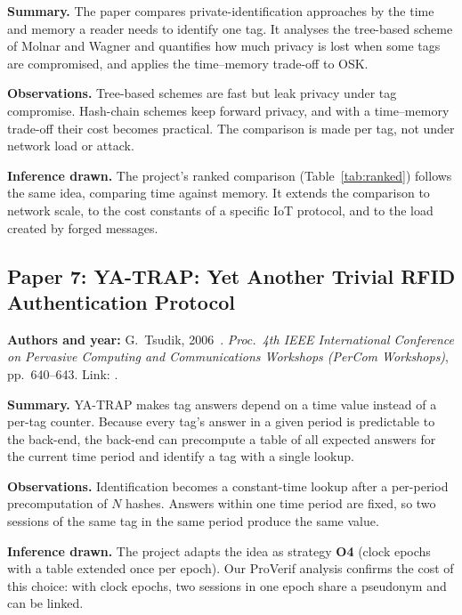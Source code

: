\textbf{Summary.} The paper compares private-identification approaches by the time and memory a reader needs to identify one tag. It analyses the tree-based scheme of Molnar and Wagner and quantifies how much privacy is lost when some tags are compromised, and applies the time--memory trade-off to OSK.

\textbf{Observations.} Tree-based schemes are fast but leak privacy under tag compromise. Hash-chain schemes keep forward privacy, and with a time--memory trade-off their cost becomes practical. The comparison is made per tag, not under network load or attack.

\textbf{Inference drawn.} The project's ranked comparison (Table~\ref{tab:ranked}) follows the same idea, comparing time against memory. It extends the comparison to network scale, to the cost constants of a specific IoT protocol, and to the load created by forged messages.

\subsection*{Paper 7: YA-TRAP: Yet Another Trivial RFID Authentication Protocol}
\textbf{Authors and year:} G.~Tsudik, 2006~\cite{tsudik}. \emph{Proc.\ 4th IEEE International Conference on Pervasive Computing and Communications Workshops (PerCom Workshops)}, pp.~640--643. Link: .

\textbf{Summary.} YA-TRAP makes tag answers depend on a time value instead of a per-tag counter. Because every tag's answer in a given period is predictable to the back-end, the back-end can precompute a table of all expected answers for the current time period and identify a tag with a single lookup.

\textbf{Observations.} Identification becomes a constant-time lookup after a per-period precomputation of $N$ hashes. Answers within one time period are fixed, so two sessions of the same tag in the same period produce the same value.

\textbf{Inference drawn.} The project adapts the idea as strategy \textbf{O4} (clock epochs with a table extended once per epoch). Our ProVerif analysis confirms the cost of this choice: with clock epochs, two sessions in one epoch share a pseudonym and can be linked.

